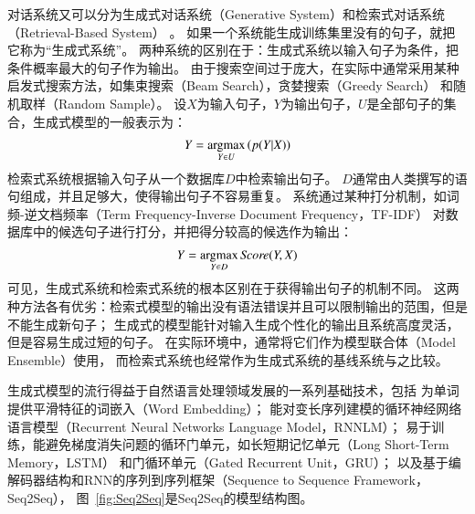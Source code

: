 对话系统又可以分为生成式对话系统（Generative System）和检索式对话系统（Retrieval-Based System）
。
如果一个系统能生成训练集里没有的句子，就把它称为“生成式系统”。
两种系统的区别在于：生成式系统以输入句子为条件，把条件概率最大的句子作为输出。
由于搜索空间过于庞大，在实际中通常采用某种启发式搜索方法，如集束搜索（Beam Search），贪婪搜索（Greedy Search）
和随机取样（Random Sample）。
设$X$为输入句子，$Y$为输出句子，$U$是全部句子的集合，生成式模型的一般表示为：
\begin{align}
    Y = \operatorname*{argmax}_{Y\in U} \left(p(Y|X)\right)
\end{align}
检索式系统根据输入句子从一个数据库$D$中检索输出句子。
$D$通常由人类撰写的语句组成，并且足够大，使得输出句子不容易重复。
系统通过某种打分机制，如词频-逆文档频率（Term Frequency-Inverse Document Frequency，TF-IDF）
对数据库中的候选句子进行打分，并把得分较高的候选作为输出：
\begin{align}
    Y = \operatorname*{argmax}_{Y\in D} \textit{Score}(Y, X)
\end{align}
可见，生成式系统和检索式系统的根本区别在于获得输出句子的机制不同。
这两种方法各有优劣：检索式模型的输出没有语法错误并且可以限制输出的范围，但是不能生成新句子；
生成式的模型能针对输入生成个性化的输出且系统高度灵活，但是容易生成过短的句子。
在实际环境中，通常将它们作为模型联合体（Model Ensemble）使用，
而检索式系统也经常作为生成式系统的基线系统与之比较。

生成式模型的流行得益于自然语言处理领域发展的一系列基础技术，包括
为单词提供平滑特征的词嵌入（Word Embedding）；
能对变长序列建模的循环神经网络语言模型（Recurrent Neural Networks Language Model，RNNLM）；
易于训练，能避免梯度消失问题的循环门单元，如长短期记忆单元（Long Short-Term Memory，LSTM）
和门循环单元（Gated Recurrent Unit，GRU）；
以及基于编解码器结构和RNN的序列到序列框架（Sequence to Sequence Framework，Seq2Seq），
图~\ref{fig:Seq2Seq}是Seq2Seq的模型结构图。

